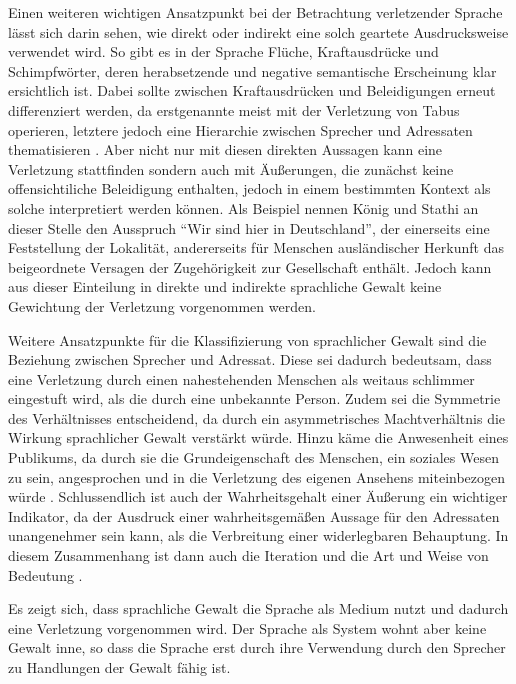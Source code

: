 Einen weiteren wichtigen Ansatzpunkt bei der Betrachtung verletzender Sprache lässt sich darin sehen, wie direkt oder indirekt eine solch geartete Ausdrucksweise verwendet wird.
So gibt es in der Sprache Flüche, Kraftausdrücke und Schimpfwörter, deren herabsetzende und negative semantische Erscheinung klar ersichtlich ist.
Dabei sollte zwischen Kraftausdrücken und Beleidigungen erneut differenziert werden, da erstgenannte meist mit der Verletzung von Tabus operieren, letztere jedoch eine Hierarchie zwischen Sprecher und Adressaten thematisieren \cite[S. 53]{EK10}.
Aber nicht nur mit diesen direkten Aussagen kann eine Verletzung stattfinden sondern auch mit Äußerungen, die zunächst keine offensichtiliche Beleidigung enthalten, jedoch in einem bestimmten Kontext als solche interpretiert werden können.
Als Beispiel nennen König und Stathi an dieser Stelle den Ausspruch "`Wir sind hier in Deutschland"', der einerseits eine Feststellung der Lokalität, andererseits für Menschen ausländischer Herkunft das beigeordnete Versagen der Zugehörigkeit zur Gesellschaft enthält.
Jedoch kann aus dieser Einteilung in direkte und indirekte sprachliche Gewalt keine Gewichtung der Verletzung vorgenommen werden.

Weitere Ansatzpunkte für die Klassifizierung von sprachlicher Gewalt sind die Beziehung zwischen Sprecher und Adressat.
Diese sei dadurch bedeutsam, dass eine Verletzung durch einen nahestehenden Menschen als weitaus schlimmer eingestuft wird, als die durch eine unbekannte Person.
Zudem sei die Symmetrie des Verhältnisses entscheidend, da durch ein asymmetrisches Machtverhältnis die Wirkung sprachlicher Gewalt verstärkt würde.
Hinzu käme die Anwesenheit eines Publikums, da durch sie die Grundeigenschaft des Menschen, ein soziales Wesen zu sein, angesprochen und in die Verletzung des eigenen Ansehens miteinbezogen würde \cite[S. 56]{EK10}.
Schlussendlich ist auch der Wahrheitsgehalt einer Äußerung ein wichtiger Indikator, da der Ausdruck einer wahrheitsgemäßen Aussage für den Adressaten unangenehmer sein kann, als die Verbreitung einer widerlegbaren Behauptung.
In diesem Zusammenhang ist dann auch die Iteration und die Art und Weise von Bedeutung \cite[S. 58]{EK10}.

Es zeigt sich, dass sprachliche Gewalt die Sprache als Medium nutzt und dadurch eine Verletzung vorgenommen wird. Der Sprache als System wohnt aber keine Gewalt inne, so dass die Sprache erst durch ihre Verwendung durch den Sprecher zu Handlungen der Gewalt fähig ist.

